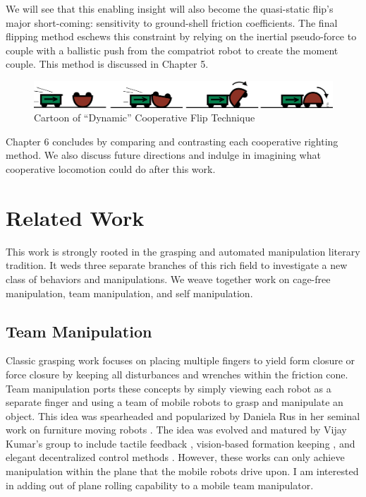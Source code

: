 \documentclass[letterpaper]{report}
\begin{document}
We will see that this enabling insight will also become the quasi-static flip's major short-coming: sensitivity to ground-shell friction coefficients.
The final flipping method eschews this constraint by relying on the inertial pseudo-force to couple with a ballistic push from the compatriot robot to create the moment couple.
This method is discussed in Chapter 5.

\begin{figure}[ht]
\centering
\includegraphics[width=1.0\textwidth]{Dynamic_CoopCartoon.png}
\caption{Cartoon of ``Dynamic'' Cooperative Flip Technique}
\end{figure}

Chapter 6 concludes by comparing and contrasting each cooperative righting method.
We also discuss future directions and indulge in imagining what cooperative locomotion could do after this work.

\section{Related Work}

This work is strongly rooted in the grasping and automated manipulation literary tradition.
It weds three separate branches of this rich field to investigate a new class of behaviors and manipulations.
We weave together work on cage-free manipulation, team manipulation, and self manipulation.

\subsection{Team Manipulation}
Classic grasping work focuses on placing multiple fingers to yield form closure or force closure by keeping all disturbances and wrenches within the friction cone.
Team manipulation ports these concepts by simply viewing each robot as a separate finger and using a team of mobile robots to grasp and manipulate an object.
This idea was spearheaded and popularized by Daniela Rus in her seminal work on furniture moving robots \cite{rus1995moving}.
The idea was evolved and matured by Vijay Kumar's group to include tactile feedback \cite{sugar2002control}, vision-based formation keeping \cite{spletzer2001cooperative}, and elegant decentralized control methods \cite{song2002potential}.
However, these works can only achieve manipulation within the plane that the mobile robots drive upon.
I am interested in adding out of plane rolling capability to a mobile team manipulator.
\end{document}
